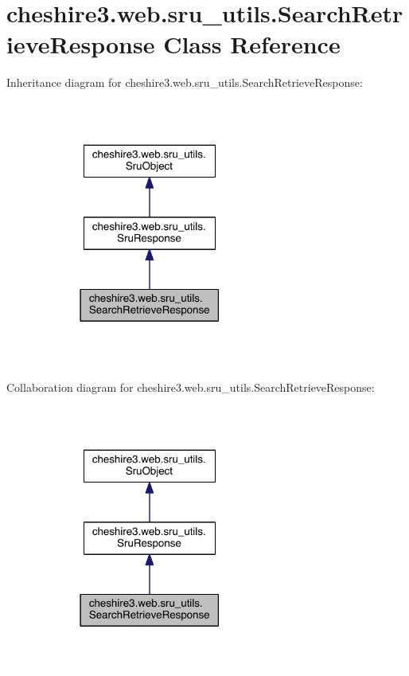 \hypertarget{classcheshire3_1_1web_1_1sru__utils_1_1_search_retrieve_response}{\section{cheshire3.\-web.\-sru\-\_\-utils.\-Search\-Retrieve\-Response Class Reference}
\label{classcheshire3_1_1web_1_1sru__utils_1_1_search_retrieve_response}
}


Inheritance diagram for cheshire3.\-web.\-sru\-\_\-utils.\-Search\-Retrieve\-Response\-:
\nopagebreak
\begin{figure}[H]
\begin{center}
\leavevmode
\includegraphics[width=210pt]{classcheshire3_1_1web_1_1sru__utils_1_1_search_retrieve_response__inherit__graph}
\end{center}
\end{figure}


Collaboration diagram for cheshire3.\-web.\-sru\-\_\-utils.\-Search\-Retrieve\-Response\-:
\nopagebreak
\begin{figure}[H]
\begin{center}
\leavevmode
\includegraphics[width=210pt]{classcheshire3_1_1web_1_1sru__utils_1_1_search_retrieve_response__coll__graph}
\end{center}
\end{figure}
